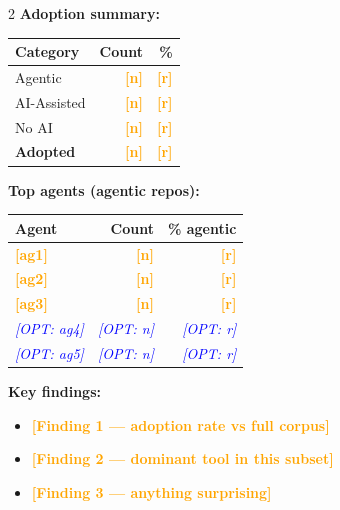 \documentclass[10pt,a4paper]{article}
\newcommand{\FILLIN}[1]{\textcolor{orange}{\textbf{[#1]}}}
\newcommand{\OPT}[1]{\textcolor{blue}{\textit{[OPT: #1]}}}
\begin{document}
\begin{multicols}{2}
\textbf{Adoption summary:}

\vspace{2pt}
\begin{tabular}{@{}lrr@{}}
\toprule
Category & Count & \% \\
\midrule
Agentic         & \FILLIN{n} & \FILLIN{r} \\
AI-Assisted     & \FILLIN{n} & \FILLIN{r} \\
No AI           & \FILLIN{n} & \FILLIN{r} \\
\midrule
\textbf{Adopted}& \textbf{\FILLIN{n}} & \textbf{\FILLIN{r}} \\
\bottomrule
\end{tabular}

\vspace{4pt}
\textbf{Top agents (agentic repos):}

\vspace{2pt}
\begin{tabular}{@{}lrr@{}}
\toprule
Agent & Count & \% agentic \\
\midrule
\FILLIN{ag1} & \FILLIN{n} & \FILLIN{r} \\
\FILLIN{ag2} & \FILLIN{n} & \FILLIN{r} \\
\FILLIN{ag3} & \FILLIN{n} & \FILLIN{r} \\
\OPT{ag4}    & \OPT{n}    & \OPT{r}    \\
\OPT{ag5}    & \OPT{n}    & \OPT{r}    \\
\bottomrule
\end{tabular}

\vspace{4pt}
\textbf{Key findings:}
\begin{itemize}\setlength\itemsep{0pt}
  \item \FILLIN{Finding 1 — adoption rate vs full corpus}
  \item \FILLIN{Finding 2 — dominant tool in this subset}
  \item \FILLIN{Finding 3 — anything surprising}
\end{itemize}

\end{multicols}

\end{document}
